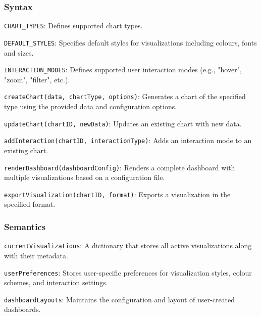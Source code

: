 \documentclass[12pt, titlepage]{article}
\begin{document}
\begin{description}
\subsubsection{Syntax}
\begin{description}
  \item[Exported Constants:] 
  \item \texttt{CHART\_TYPES}: Defines supported chart types.
  \item \texttt{DEFAULT\_STYLES}: Specifies default styles for visualizations including colours, 
  fonts and sizes.
  \item \texttt{INTERACTION\_MODES}: Defines supported user interaction modes (e.g., "hover", "zoom",
  "filter", etc.).
  \item 
  \item[Exported Access Programs:] 
  \item \texttt{createChart(data, chartType, options)}: Generates a chart of the specified type using 
  the provided data and configuration options.
  \item \texttt{updateChart(chartID, newData)}: Updates an existing chart with new data.
  \item \texttt{addInteraction(chartID, interactionType)}: Adds an interaction mode to an existing chart.
  \item \texttt{renderDashboard(dashboardConfig)}: Renders a complete dashboard with multiple visualizations 
  based on a configuration file.
  \item \texttt{exportVisualization(chartID, format)}: Exports a visualization in the specified format.
  \item
\end{description}

\subsubsection{Semantics}
\begin{description}
  \item[State Variables:]
  \item \texttt{currentVisualizations}: A dictionary that stores all active visualizations along with their 
  metadata.
  \item \texttt{userPreferences}: Stores user-specific preferences for visualization styles, colour schemes,
  and interaction settings.
  \item \texttt{dashboardLayouts}: Maintains the configuration and layout of user-created dashboards.
  \item 


\end{description}
\end{description}
\end{document}
